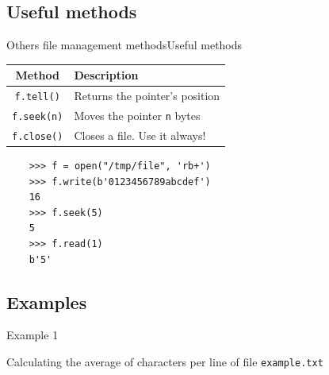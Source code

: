 \documentclass[10pt,compress]{beamer} %
\begin{document}
\subsection{Useful methods}
\begin{frame}[fragile]{Others file management methods}{Useful methods}

	\begin{tabular}{c|l}\hline
  	\sc Method & \sc Description  \\\hline
  	\texttt{f.tell()} & Returns the pointer's position \\
  	\texttt{f.seek(n)} & Moves the pointer \texttt{n} bytes \\
  	\texttt{f.close()} & Closes a file. Use it always! \\\hline
  	\end{tabular}

	\begin{verbatim}
	>>> f = open("/tmp/file", 'rb+')
	>>> f.write(b'0123456789abcdef')
	16
	>>> f.seek(5)
	5
	>>> f.read(1)
	b'5'
	\end{verbatim}
\end{frame}

\subsection{Examples}
\begin{frame}[fragile]{Example 1}{}
	\begin{block}{Calculating the average of characters per line of file \texttt{example.txt}}
	\vspace{-0.2cm}
	
	\vspace{-0.2cm}
	\end{block}

	
\end{frame}
\end{document}
